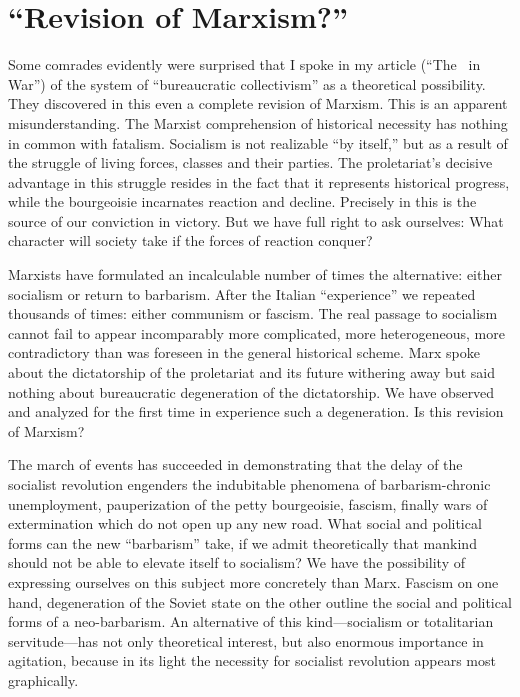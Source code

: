 \section*{“Revision of Marxism?”}

Some comrades evidently were surprised that I spoke in my article (``The \USSR\ in War'') of the system of “bureaucratic collectivism” as a theoretical possibility. They discovered in this even a complete revision of Marxism. This is an apparent misunderstanding. The Marxist comprehension of historical necessity has nothing in common with fatalism. Socialism is not realizable “by itself,” but as a result of the struggle of living forces, classes and their parties. The proletariat’s decisive advantage in this struggle resides in the fact that it represents historical progress, while the bourgeoisie incarnates reaction and decline. Precisely in this is the source of our conviction in victory. But we have full right to ask ourselves: What character will society take if the forces of reaction conquer?

Marxists have formulated an incalculable number of times the alternative: either socialism or return to barbarism. After the Italian “experience” we repeated thousands of times: either communism or fascism. The real passage to socialism cannot fail to appear incomparably more complicated, more heterogeneous, more contradictory than was foreseen in the general historical scheme. Marx spoke about the dictatorship of the proletariat and its future withering away but said nothing about bureaucratic degeneration of the dictatorship. We have observed and analyzed for the first time in experience such a degeneration. Is this revision of Marxism?

The march of events has succeeded in demonstrating that the delay of the socialist revolution engenders the indubitable phenomena of barbarism-chronic unemployment, pauperization of the petty bourgeoisie, fascism, finally wars of extermination which do not open up any new road. What social and political forms can the new “barbarism” take, if we admit theoretically that mankind should not be able to elevate itself to socialism? We have the possibility of expressing ourselves on this subject more concretely than Marx. Fascism on one hand, degeneration of the Soviet state on the other outline the social and political forms of a neo-barbarism. An alternative of this kind---socialism or totalitarian servitude---has not only theoretical interest, but also enormous importance in agitation, because in its light the necessity for socialist revolution appears most graphically.

